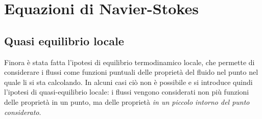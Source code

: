 %
\section{Equazioni di Navier-Stokes} 

\subsection{Quasi equilibrio locale}
Finora è stata fatta l'ipotesi di equilibrio termodinamico locale, che permette di considerare i flussi come funzioni puntuali delle proprietà del fluido nel punto nel quale li si sta calcolando.
In alcuni casi ciò non è possibile e si introduce quindi l'ipotesi di quasi-equilibrio locale: i flussi vengono considerati non più funzioni delle proprietà in un punto, ma delle proprietà \textit{in un piccolo intorno del punto considerato}.

